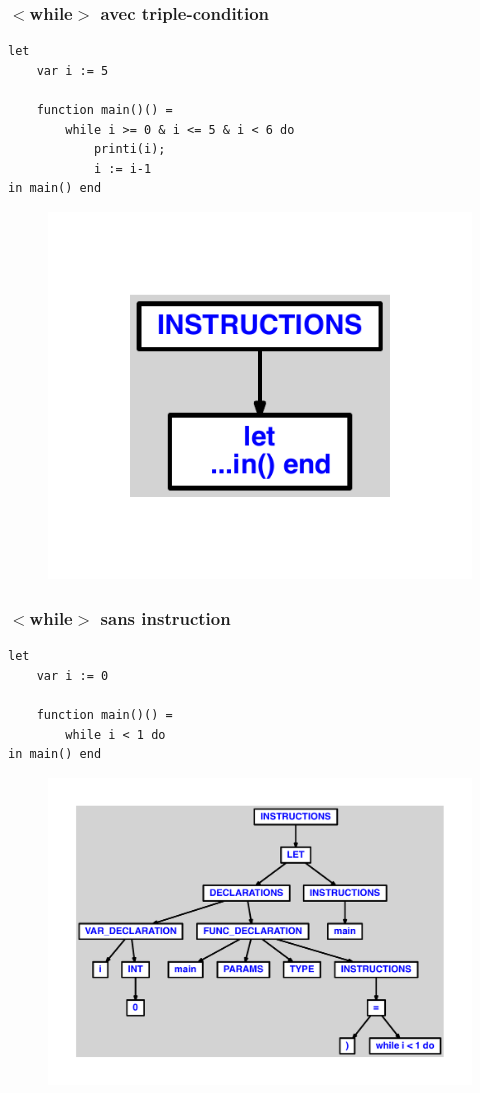 \documentclass{article}
\begin{document}
\subsubsection{$ < $while$ > $ avec triple-condition}
\begin{lstlisting}
let
	var i := 5

	function main()() =
		while i >= 0 & i <= 5 & i < 6 do
			printi(i);
			i := i-1
in main() end
\end{lstlisting}
\newpage
\begin{figure}[H]
\centering
\includegraphics[max width=\textwidth]{ast/ast_332.pdf}
\end{figure}
\newpage
\subsubsection{$ < $while$ > $ sans instruction}
\begin{lstlisting}
let
	var i := 0

	function main()() =
		while i < 1 do
in main() end
\end{lstlisting}
\newpage
\begin{figure}[H]
\centering
\includegraphics[max width=\textwidth]{ast/ast_333.pdf}
\end{figure}
\newpage
\end{document}
